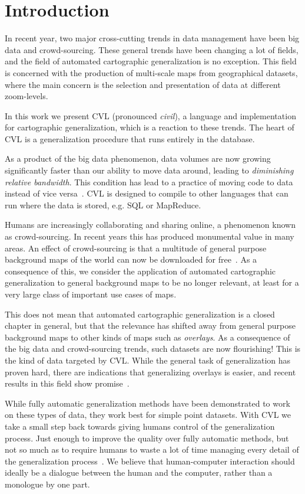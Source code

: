 \section{Introduction}
In recent year, two major cross-cutting trends in data management have been  big data and crowd-sourcing. These general trends have been changing a lot of fields, and the field of automated cartographic generalization is no exception. This field is concerned with the production of multi-scale maps from geographical datasets, where the main concern is the selection and presentation of data at different zoom-levels.

In this work we present CVL (pronounced \emph{civil}), a language and implementation for cartographic generalization, which is a reaction to these trends. The heart of CVL is a generalization procedure that runs entirely in the database.

As a product of the big data phenomenon, data volumes are now growing significantly faster than our ability to move data around, leading to \emph{diminishing relative bandwidth}. This condition has lead to a practice of moving code to data~\cite{mapreduce} instead of vice versa~\cite{fusiontables}. CVL is designed to compile to other languages that can run where the data is stored, e.g. SQL or MapReduce.

Humans are increasingly collaborating and sharing online, a phenomenon known as crowd-sourcing. In recent years this has produced monumental value in many areas. An effect of crowd-sourcing is that a multitude of general purpose background maps of the world can now be downloaded for free~\cite{openstreetmap,googlemaps,bingmaps}. As a consequence of this, we consider the application of automated cartographic generalization to general background maps to be no longer relevant, at least for a very large class of important use cases of maps.

This does not mean that automated cartographic generalization is a closed chapter in general, but that the relevance has shifted away from general purpose background maps to other kinds of maps such as \emph{overlays}. As a consequence of the big data and crowd-sourcing trends, such datasets are now flourishing! This is the kind of data targeted by CVL. While the general task of generalization has proven hard, there are indications that generalizing overlays is easier, and recent results in this field show promise~\cite{fusiontables,thatotherpaper}. 

While fully automatic generalization methods have been demonstrated to work on these types of data, they work best for simple point datasets. With CVL we take a small step back towards giving humans control of the generalization process. Just enough to improve the quality over fully automatic methods, but not so much as to require humans to waste a lot of time managing every detail of the generalization process~\cite{fme}. We believe that human-computer interaction should ideally be a dialogue between the human and the computer, rather than a monologue by one part.

